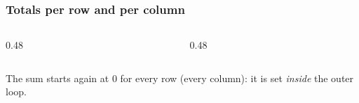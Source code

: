 \documentclass[aspectratio=169,10pt,compress]{beamer}
\begin{document}
\begin{frame}[t,fragile] \frametitle{Totals per row and per column}
	\begin{columns}[T]
		\begin{column}{0.48\textwidth}


\begin{algorithm}[H]
				\caption{RowTotals($t$)}
\end{algorithm}

		\end{column}
		\begin{column}{0.48\textwidth}


\begin{algorithm}[H]
				\caption{ColumnTotals($t$), rectangular}
\end{algorithm}

		\end{column}
	\end{columns}

	\vspace{0.5em}
	\small The sum starts again at 0 for every row (every column): it is set \emph{inside} the outer loop.
\end{frame}
\end{document}
